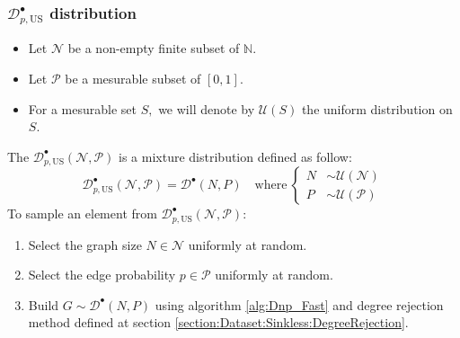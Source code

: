 	\subsubsection{$\mathcal{D}^\bullet_{p,\text{US}}$ distribution}
	\begin{itemize}
		\item Let $\mathcal{N}$ be a non-empty finite subset of $\mathbb{N}.$ 
		\item Let $\mathcal{P}$ be a mesurable subset of $[0,1].$
		\item For a mesurable set $S,$ we will denote by $\mathcal{U}(S)$ the uniform distribution on $S.$
	\end{itemize}
	The $\mathcal{D}^\bullet_{p,\text{US}}(\mathcal{N},\mathcal{P})$ is a mixture distribution defined as follow:
	\begin{equation*}
		\mathcal{D}^\bullet_{p,\text{US}}(\mathcal{N},\mathcal{P}) = \mathcal{D}^\bullet(N,P) \quad \text{where}\ \begin{cases}
			N &\sim \mathcal{U}(\mathcal{N}) \\
			P &\sim \mathcal{U}(\mathcal{P})
		\end{cases}
	\end{equation*}
	To sample an element from $\mathcal{D}^\bullet_{p,\text{US}}(\mathcal{N},\mathcal{P})$:
	\begin{enumerate}
		\item Select the graph size $N\in\mathcal{N}$ uniformly at random.
		\item Select the edge probability $p\in\mathcal{P}$ uniformly at random.
		\item Build $G\sim \mathcal{D}^\bullet(N,P)$ using algorithm \ref{alg:Dnp_Fast} and degree rejection method defined at section \ref{section:Dataset:Sinkless:DegreeRejection}.
			
	\end{enumerate} 
	
